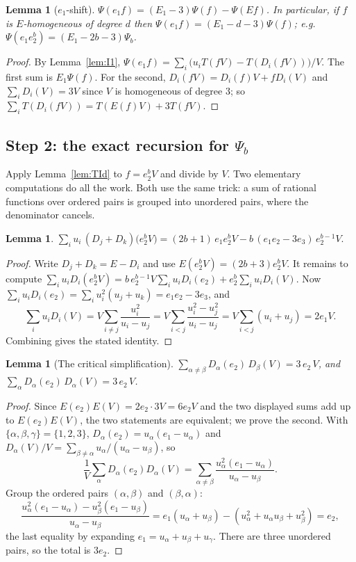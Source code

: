 \documentclass[10pt]{article}
\theoremstyle{plain}
\newtheorem{lemma}[theorem]{Lemma}
\theoremstyle{definition}
\begin{document}
\begin{lemma}[$e_1$-shift]\label{lem:e1shift}
$\Psi(e_1f)=(E_1-3)\Psi(f)-\Psi(E f)$. In particular, if $f$ is $E$-homogeneous of degree
$d$ then $\Psi(e_1f)=(E_1-d-3)\Psi(f)$; e.g.\ $\Psi(e_1e_2^b)=(E_1-2b-3)\Psi_b$.
\end{lemma}

\begin{proof}
By Lemma~\ref{lem:I1}, $\Psi(e_1f)=\sum_i\big(u_iT(fV)-T(D_i(fV))\big)/V$. The first sum is
$E_1\Psi(f)$. For the second, $D_i(fV)=D_i(f)V+fD_i(V)$ and $\sum_iD_i(V)=3V$ since $V$ is
homogeneous of degree $3$; so $\sum_iT(D_i(fV))=T(E(f)V)+3T(fV)$.
\end{proof}

\subsection{Step 2: the exact recursion for $\Psi_b$}

Apply Lemma~\ref{lem:TId} to $f=e_2^bV$ and divide by $V$. Two elementary computations do
all the work. Both use the same trick: a sum of rational functions over ordered pairs is
grouped into unordered pairs, where the denominator cancels.

\begin{lemma}\label{lem:K1}
$\displaystyle\sum_{i}u_i\,(D_j+D_k)\big(e_2^bV\big)
 =(2b+1)\,e_1e_2^bV-b\,(e_1e_2-3e_3)\,e_2^{b-1}V.$
\end{lemma}

\begin{proof}
Write $D_j+D_k=E-D_i$ and use $E(e_2^bV)=(2b+3)e_2^bV$. It remains to compute
$\sum_iu_iD_i(e_2^bV)=b\,e_2^{b-1}V\sum_iu_iD_i(e_2)+e_2^b\sum_iu_iD_i(V)$. Now
$\sum_iu_iD_i(e_2)=\sum_iu_i^2(u_j+u_k)=e_1e_2-3e_3$, and
\[
 \sum_iu_iD_i(V)=V\sum_{i\ne j}\frac{u_i^2}{u_i-u_j}
 =V\sum_{i<j}\frac{u_i^2-u_j^2}{u_i-u_j}=V\sum_{i<j}(u_i+u_j)=2e_1V .
\]
Combining gives the stated identity.
\end{proof}

\begin{lemma}[The critical simplification]\label{lem:K5}
$\displaystyle \sum_{\alpha\neq\beta}D_\alpha(e_2)\,D_\beta(V)=3\,e_2\,V$, and
$\displaystyle \sum_{\alpha}D_\alpha(e_2)\,D_\alpha(V)=3\,e_2\,V$.
\end{lemma}

\begin{proof}
Since $E(e_2)E(V)=2e_2\cdot 3V=6e_2V$ and the two displayed sums add up to $E(e_2)E(V)$, the
two statements are equivalent; we prove the second. With $\{\alpha,\beta,\gamma\}=\{1,2,3\}$,
$D_\alpha(e_2)=u_\alpha(e_1-u_\alpha)$ and $D_\alpha(V)/V=\sum_{\beta\ne\alpha}
u_\alpha/(u_\alpha-u_\beta)$, so
\[
 \frac1V\sum_\alpha D_\alpha(e_2)D_\alpha(V)
 =\sum_{\alpha\ne\beta}\frac{u_\alpha^2(e_1-u_\alpha)}{u_\alpha-u_\beta}.
\]
Group the ordered pairs $(\alpha,\beta)$ and $(\beta,\alpha)$:
\[
 \frac{u_\alpha^2(e_1-u_\alpha)-u_\beta^2(e_1-u_\beta)}{u_\alpha-u_\beta}
 =e_1(u_\alpha+u_\beta)-(u_\alpha^2+u_\alpha u_\beta+u_\beta^2)=e_2,
\]
the last equality by expanding $e_1=u_\alpha+u_\beta+u_\gamma$. There are three unordered
pairs, so the total is $3e_2$.
\end{proof}
\end{document}
